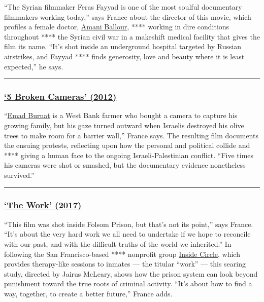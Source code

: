 ``The Syrian filmmaker Feras Fayyad is one of the most soulful
documentary filmmakers working today,'' says France about the director
of this movie, which profiles a female doctor,
\href{https://www.nytimes.com/2020/02/11/world/middleeast/her-dream-of-becoming-a-doctor-turned-into-a-nightmare-and-a-movie.html}{Amani
Ballour}, **** working in dire conditions throughout **** the Syrian
civil war in a makeshift medical facility that gives the film its name.
``It's shot inside an underground hospital targeted by Russian
airstrikes, and Fayyad **** finds generosity, love and beauty where it
is least expected,'' he says.

\begin{center}\rule{0.5\linewidth}{\linethickness}\end{center}

\hypertarget{5-broken-cameras-2012}{%
\subsubsection{\texorpdfstring{\href{https://www.nytimes.com/2012/05/30/movies/5-broken-cameras-shows-life-in-one-palestinian-village.html}{`5
Broken Cameras'
(2012)}}{`5 Broken Cameras' (2012)}}\label{5-broken-cameras-2012}}

``\href{https://www.nytimes.com/2012/01/23/world/middleeast/documentary-from-emad-burnats-camera-competes-at-sundance.html}{Emad
Burnat} is a West Bank farmer who bought a camera to capture his growing
family, but his gaze turned outward when Israelis destroyed his olive
trees to make room for a barrier wall,'' France says. The resulting film
documents the ensuing protests, reflecting upon how the personal and
political collide and **** giving a human face to the ongoing
Israeli-Palestinian conflict. ``Five times his cameras were shot or
smashed, but the documentary evidence nonetheless survived.''

\begin{center}\rule{0.5\linewidth}{\linethickness}\end{center}

\hypertarget{the-work-2017}{%
\subsubsection{\texorpdfstring{\href{https://www.nytimes.com/2017/10/26/movies/the-work-review.html}{`The
Work' (2017)}}{`The Work' (2017)}}\label{the-work-2017}}

``This film was shot inside Folsom Prison, but that's not its point,''
says France. ``It's about the very hard work we all need to undertake if
we hope to reconcile with our past, and with the difficult truths of the
world we inherited.'' In following the San Francisco-based ****
nonprofit group \href{https://insidecircle.org/about-us/}{Inside
Circle}, which provides therapy-like sessions to inmates --- the titular
``work'' --- this searing study, directed by Jairus McLeary, shows how
the prison system can look beyond punishment toward the true roots of
criminal activity. ``It's about how to find a way, together, to create a
better future,'' France adds.

